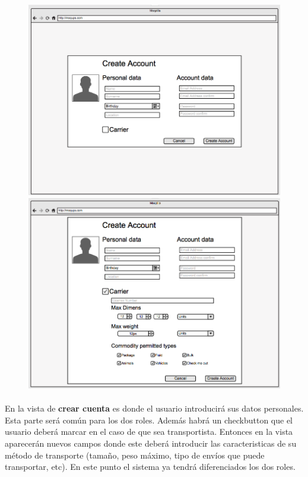 \documentclass[10pt, a4paper,spanish]{article}
\begin{document}
			\begin{figure}[H]
				\centering
				\begin{minipage}[b]{0.49\textwidth}
					\includegraphics[width=\textwidth]{res/sketch_create_account.png}
				\end{minipage}
				\begin{minipage}[b]{0.49\textwidth}
					\includegraphics[width=\textwidth]{res/sketch_create_account_carrier.png}
				\end{minipage}
			\end{figure}

			\paragraph{}
			En la vista de \textbf{crear cuenta} es donde el usuario introducirá sus datos personales. Esta parte será común para los dos roles. Además habrá un checkbutton que el usuario deberá marcar en el caso de que sea transportista. Entonces en la vista aparecerán nuevos campos donde este deberá introducir las caracteristicas de su método de transporte (tamaño, peso máximo, tipo de envíos que puede transportar, etc). En este punto el sistema ya tendrá diferenciados los dos roles.
\end{document}
